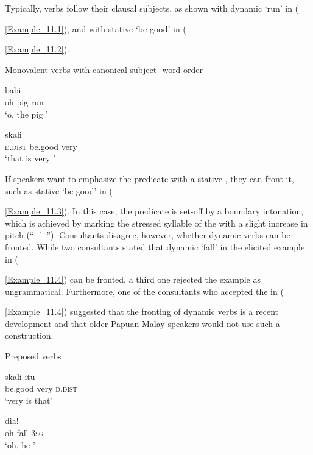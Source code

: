 Typically,  verbs follow their clausal subjects, as shown with dynamic  ‘run’ in ({\ref{Example_11.1}), and with stative  ‘be good’ in ({\ref{Example_11.2}).


\begin{styleExampleTitle}
Monovalent verbs with canonical subject- word order
\end{styleExampleTitle}

\ea
\label{Example_11.1}
 {babi} {}\\ %
 oh  pig  run\\
\glt 
‘o, the pig ’ \textstyleExampleSource{[080919-004-NP.0021]}
\z

\ea
\label{Example_11.2}
 {} {skali}\\ %
 \textsc{d.dist}  be.good  very\\
\glt 
‘that is very ’ \textstyleExampleSource{[081025-003-Cv.0267]}
\z


If speakers want to emphasize the predicate with a  stative , they can front it, such as stative  ‘be good’ in ({\ref{Example_11.3}). In this case, the predicate is set-off by a boundary intonation, which is achieved by marking the stressed syllable of the  with a slight increase in pitch (“~\'{~}~”). Consultants disagree, however, whether  dynamic verbs can be fronted. While two consultants stated that dynamic  ‘fall’ in the elicited example in ({\ref{Example_11.4}) can be fronted, a third one rejected the example as ungrammatical. Furthermore, one of the consultants who accepted the  in ({\ref{Example_11.4}) suggested that the fronting of  dynamic verbs is a recent development and that older Papuan Malay speakers would not use such a construction.


\begin{styleExampleTitle}
Preposed  verbs
\end{styleExampleTitle}

\ea
\label{Example_11.3}
 {skali} {itu}\\ %
 be.good  very  \textsc{d.dist}\\
\glt 
‘very  is that’ \textstyleExampleSource{[081025-003-Cv.0270]}
\z

\ea
\label{Example_11.4}
 {} {dia!}\\ %
 oh  fall  \textsc{3sg}\\
\glt 
‘oh, he ’ \textstyleExampleSource{[Elicited BR131227.001]}
\z


}}}}}
